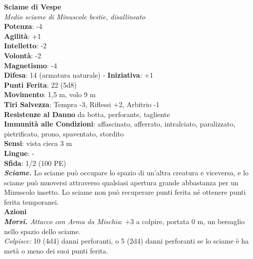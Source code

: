 \begin{multicols}{2}
\medskip\textbf{Sciame di Vespe}\\
\emph{Medio sciame di Minuscole bestie, disallineato}\\
\textbf{Potenza}: -4\\
\textbf{Agilità}: +1\\
\textbf{Intelletto}: -2\\
\textbf{Volontà}: -2\\
\textbf{Magnetismo}: -4\\
\textbf{Difesa}: 14 (armatura naturale) - \textbf{Iniziativa}: +1\\
\textbf{Punti Ferita}: 22 (5d8)\\
\textbf{Movimento}: 1,5 m, volo 9 m\\
\textbf{Tiri Salvezza}: Tempra -3, Riflessi +2, Arbitrio -1\\
\textbf{Resistenze al Danno} da botta, perforante, tagliente\\
\textbf{Immunità alle Condizioni}: affascinato, afferrato, intralciato, paralizzato, pietrificato, prono, spaventato, stordito\\
\textbf{Sensi}: vista cieca 3 m\\
\textbf{Lingue}: -\\
\textbf{Sfida}: 1/2 (100 PE)\smallskip\\
\emph{\textbf{Sciame.}} Lo sciame può occupare lo spazio di un'altra creatura e viceversa, e lo sciame può muoversi attraverso qualsiasi apertura grande abbastanza per un Minuscolo insetto. Lo sciame non può recuperare punti ferita né ottenere punti ferita temporanei.\\
\smallskip\textbf{Azioni}\\
\emph{\textbf{Morsi.} Attacco con Arma da Mischia}: +3 a colpire, portata 0 m, un bersaglio nello spazio dello sciame.\\
\emph{Colpisce:} 10 (4d4) danni perforanti, o 5 (2d4) danni perforanti se lo sciame è ha metà o meno dei suoi punti ferita.\\


\end{multicols}
